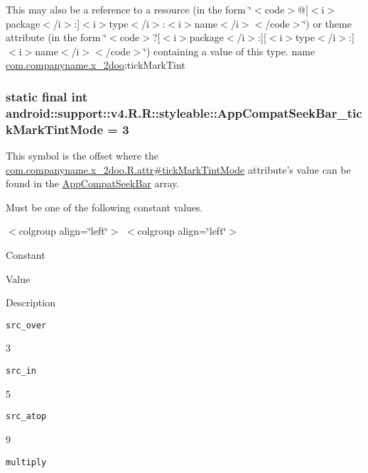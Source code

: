 This may also be a reference to a resource (in the form \char`\"{}$<$code$>$@\mbox{[}$<$i$>$package$<$/i$>$:\mbox{]}$<$i$>$type$<$/i$>$:$<$i$>$name$<$/i$>$$<$/code$>$\char`\"{}) or theme attribute (in the form \char`\"{}$<$code$>$?\mbox{[}$<$i$>$package$<$/i$>$:\mbox{]}\mbox{[}$<$i$>$type$<$/i$>$:\mbox{]}$<$i$>$name$<$/i$>$$<$/code$>$\char`\"{}) containing a value of this type.  name \hyperlink{namespacecom_1_1companyname_1_1x__2doo}{com.companyname.x\_\-2doo}:tickMarkTint \hypertarget{classandroid_1_1support_1_1v4_1_1_r_1_1styleable_768563f41000484be3e1b36b3ce945e9}{
\subsubsection[{AppCompatSeekBar\_\-tickMarkTintMode}]{\setlength{\rightskip}{0pt plus 5cm}static final int android::support::v4.R.R::styleable::AppCompatSeekBar\_\-tickMarkTintMode = 3}}
\label{classandroid_1_1support_1_1v4_1_1_r_1_1styleable_768563f41000484be3e1b36b3ce945e9}


This symbol is the offset where the \hyperlink{classcom_1_1companyname_1_1x__2doo_1_1_r_1_1attr_dbe326d1dc87f4553866734cdb38566f}{com.companyname.x\_\-2doo.R.attr\#tickMarkTintMode} attribute's value can be found in the \hyperlink{classandroid_1_1support_1_1v4_1_1_r_1_1styleable_7fa9b523f74ed9ed71772420c84dee04}{AppCompatSeekBar} array.

Must be one of the following constant values. \begin{TabularC}{0}
\hline
\end{TabularC}
$<$colgroup align=\char`\"{}left\char`\"{}$>$ $<$colgroup align=\char`\"{}left\char`\"{}$>$ 

Constant

Value

Description 

{\tt src\_\-over}

3

{\tt src\_\-in}

5

{\tt src\_\-atop}

9

{\tt multiply}

